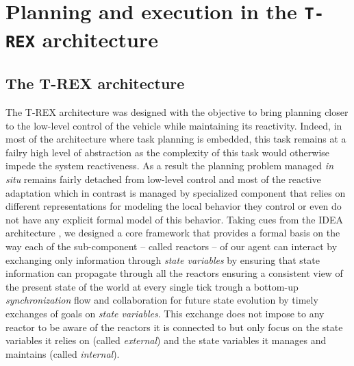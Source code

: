 \section{Planning and execution in the \texttt{T-REX} architecture}
\label{sec:arch}

\subsection{The T-REX architecture}
\label{sec:arch:trex}

 
The T-REX architecture was designed with the objective to bring 
planning closer to the low-level control of the vehicle while
maintaining its reactivity. Indeed, in most of the architecture where
task planning is embedded, this task remains at a failry high level of
abstraction as the complexity of this task would otherwise impede the
system reactiveness. As a result the planning problem managed {\em in
  situ} remains fairly detached from low-level control and most of the 
reactive adaptation which in contrast is managed by specialized 
component that relies on different representations for modeling 
the local behavior they control or even do not have any explicit 
formal model of this behavior. Taking cues from the IDEA 
architecture \cite{mus02}, we designed a core framework that provides a
formal basis \cite{Py:2010ti} on the way each of the sub-component --
called reactors -- of our agent can interact by exchanging only
information through {\em state variables} by ensuring that state 
information can propagate through all the reactors ensuring a
consistent view of the present state of the world at every single tick
trough a bottom-up {\em synchronization} flow and collaboration for
future state evolution by timely exchanges of goals on {\em state
  variables}. This exchange does not impose to any reactor to be aware
of the reactors it is connected to but only focus on the state
variables it relies on (called {\em external}) and the state
variables it manages and maintains (called {\em internal}). 

